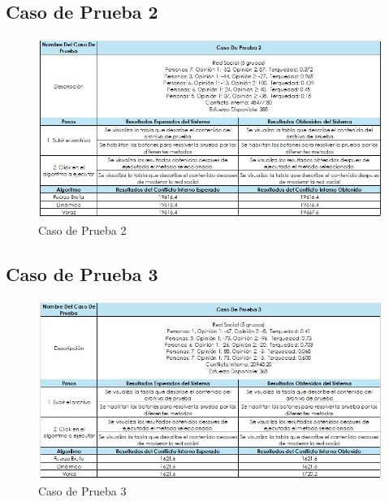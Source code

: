 \documentclass[11pt,letter]{article}
\begin{document}
\subsection{Caso de Prueba 2}
\begin{figure}[H]
    \centering
    \includegraphics[width=\linewidth]{resources/cp2.jpeg}
    \caption{Caso de Prueba 2}
    \label{fig:cp2}
\end{figure}

\subsection{Caso de Prueba 3}
\begin{figure}[H]
    \centering
    \includegraphics[width=\linewidth]{resources/cp3.jpeg}
    \caption{Caso de Prueba 3}
    \label{fig:cp3}
\end{figure}
\end{document}
